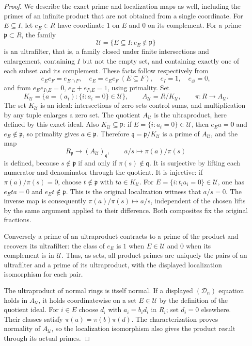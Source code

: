 \begin{proof}
We describe the exact prime and localization maps as well,
including the primes of an infinite product that are not obtained
from a single coordinate. For $E\subseteq I$, let $e_E\in R$
have coordinate $1$ on $E$ and $0$ on its complement. For a
prime $\mathfrak p\subset R$, the family
$$
\mathcal U=\{E\subseteq I:e_E\notin\mathfrak p\}
$$
is an ultrafilter, that is, a family closed under finite intersections
and enlargement, containing $I$ but not the empty set, and containing
exactly one of each subset and its complement. These facts follow
respectively from
$$
e_Ee_F=e_{E\cap F},\quad
e_E=e_Ee_F\ (E\subseteq F),\quad
e_I=1,\quad e_\varnothing=0,
$$
and from $e_Ee_{I\setminus E}=0$,
$e_E+e_{I\setminus E}=1$, using primality.
Set
$$
K_{\mathcal U}=\{a=(a_i):\{i:a_i=0\}\in\mathcal U\},
\qquad A_{\mathcal U}=R/K_{\mathcal U},
\qquad\pi:R\to A_{\mathcal U}.
$$
The set $K_{\mathcal U}$ is an ideal: intersections of zero sets
control sums, and multiplication by any tuple enlarges a zero set.
The quotient $A_{\mathcal U}$ is the ultraproduct, here defined by
this exact ideal. Also $K_{\mathcal U}\subseteq\mathfrak p$:
if $E=\{i:a_i=0\}\in\mathcal U$, then $e_Ea=0$ and
$e_E\notin\mathfrak p$, so primality gives $a\in\mathfrak p$.
Therefore $\mathfrak q=\mathfrak p/K_{\mathcal U}$ is a prime
of $A_{\mathcal U}$, and the map
$$
R_{\mathfrak p}\longrightarrow (A_{\mathcal U})_{\mathfrak q},
\qquad a/s\longmapsto\pi(a)/\pi(s)
$$
is defined, because $s\notin\mathfrak p$ if and only if
$\pi(s)\notin\mathfrak q$. It is surjective by lifting each
numerator and denominator through the quotient. It is injective:
if $\pi(a)/\pi(s)=0$, choose $t\notin\mathfrak p$ with
$ta\in K_{\mathcal U}$. For
$E=\{i:t_ia_i=0\}\in\mathcal U$, one has
$e_Eta=0$ and $e_Et\notin\mathfrak p$. This is the original
localization witness that $a/s=0$. The inverse map is consequently
$\pi(a)/\pi(s)\mapsto a/s$, independent of the chosen lifts by
the same argument applied to their difference. Both composites fix
the original fractions.

Conversely a prime of an ultraproduct contracts to a prime of
the product and recovers its ultrafilter: the class of $e_E$ is
$1$ when $E\in\mathcal U$ and $0$ when its complement is in
$\mathcal U$. Thus, as sets, all product primes are uniquely the
pairs of an ultrafilter and a prime of its ultraproduct, with the
displayed localization isomorphism for each pair.

The ultraproduct of normal rings is itself normal. If a displayed
$(\mathcal D_n)$ equation holds in $A_{\mathcal U}$, it holds
coordinatewise on a set $E\in\mathcal U$ by the definition of
the quotient ideal. For $i\in E$ choose $d_i$ with $a_i=b_id_i$
in $R_i$; set $d_i=0$ elsewhere. Their classes satisfy
$\pi(a)=\pi(b)\pi(d)$. The characterization proves normality
of $A_{\mathcal U}$, so the localization isomorphism also gives
the product result through its actual primes.


\end{proof}

